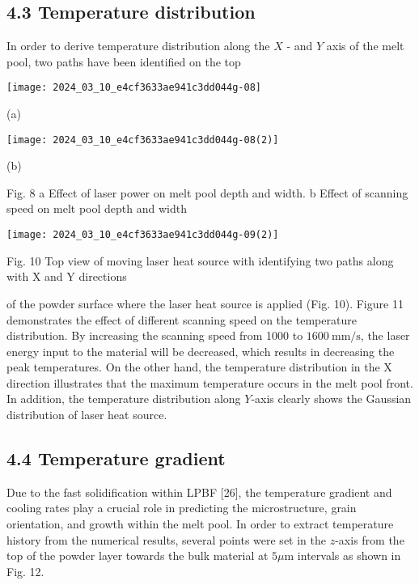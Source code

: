 \documentclass[10pt]{article}
\begin{document}
\subsection*{4.3 Temperature distribution}
In order to derive temperature distribution along the $X$ - and $Y$ axis of the melt pool, two paths have been identified on the top

\begin{center}
\texttt{[image: 2024\_03\_10\_e4cf3633ae941c3dd044g-08]}
\end{center}

(a)

\begin{center}
\texttt{[image: 2024\_03\_10\_e4cf3633ae941c3dd044g-08(2)]}
\end{center}

(b)

Fig. 8 a Effect of laser power on melt pool depth and width. b Effect of scanning speed on melt pool depth and width

\begin{center}
\texttt{[image: 2024\_03\_10\_e4cf3633ae941c3dd044g-09(2)]}
\end{center}

Fig. 10 Top view of moving laser heat source with identifying two paths along with $\mathrm{X}$ and $\mathrm{Y}$ directions

of the powder surface where the laser heat source is applied (Fig. 10). Figure 11 demonstrates the effect of different scanning speed on the temperature distribution. By increasing the scanning speed from 1000 to $1600 \mathrm{~mm} / \mathrm{s}$, the laser energy input to the material will be decreased, which results in decreasing the peak temperatures. On the other hand, the temperature distribution in the $\mathrm{X}$ direction illustrates that the maximum temperature occurs in the melt pool front. In addition, the temperature distribution along $Y$-axis clearly shows the Gaussian distribution of laser heat source.

\subsection*{4.4 Temperature gradient}
Due to the fast solidification within LPBF [26], the temperature gradient and cooling rates play a crucial role in predicting the microstructure, grain orientation, and growth within the melt pool. In order to extract temperature history from the numerical results, several points were set in the $z$-axis from the top of the powder layer towards the bulk material at $5 \mu \mathrm{m}$ intervals as shown in Fig. 12.
\end{document}
